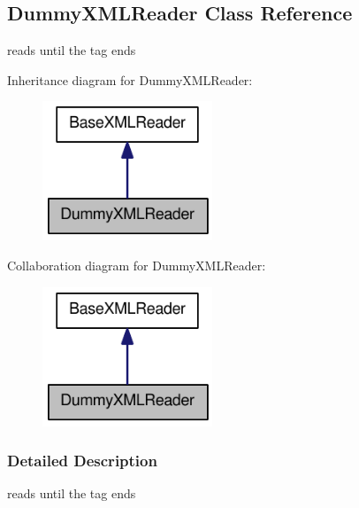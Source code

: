 \hypertarget{classOpenRAVE_1_1DummyXMLReader}{
\subsection{DummyXMLReader Class Reference}
\label{classOpenRAVE_1_1DummyXMLReader}
}


reads until the tag ends  




Inheritance diagram for DummyXMLReader:\nopagebreak
\begin{figure}[H]
\begin{center}
\leavevmode
\includegraphics[width=144pt]{classOpenRAVE_1_1DummyXMLReader__inherit__graph}
\end{center}
\end{figure}


Collaboration diagram for DummyXMLReader:\nopagebreak
\begin{figure}[H]
\begin{center}
\leavevmode
\includegraphics[width=144pt]{classOpenRAVE_1_1DummyXMLReader__coll__graph}
\end{center}
\end{figure}


\subsubsection{Detailed Description}
reads until the tag ends 